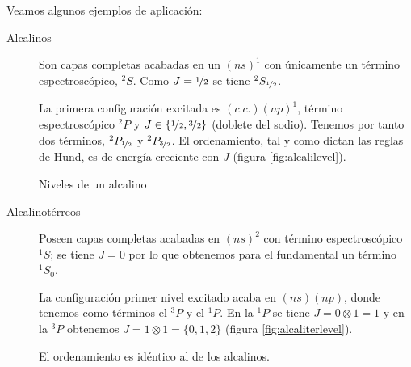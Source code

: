 Veamos algunos ejemplos de aplicación:
\begin{description}
\item[Alcalinos]
  Son capas completas acabadas en un $(ns)^1$ con únicamente un término
  espectroscópico, ${}^2S$. Como $J={\nicefrac{1}{2}}$ se tiene
  ${}^2S_{{\nicefrac{1}{2}}}$. 

  La primera configuración excitada es $(c.c.)(np)^1$, término
  espectroscópico ${}^2P$ y $J\in\{{\nicefrac{1}{2}},\nicefrac{3}{2}\}$ (doblete del
  sodio). Tenemos por tanto dos términos, ${}^2P_{{\nicefrac{1}{2}}}$ y
  ${}^2P_{\nicefrac{3}{2}}$. El ordenamiento, tal y como dictan las
  reglas de Hund, es de energía creciente con $J$ (figura \ref{fig:alcalilevel}).
  \begin{marginfigure}
    \centering
    \caption{Niveles de un alcalino}
    \label{fig:alcalilevel}
  \end{marginfigure}


\item[Alcalinotérreos]
  Poseen capas completas acabadas en $(ns)^2$ con término
  espectroscópico ${}^1S$; se tiene $J=0$ por lo que obtenemos para el
  fundamental un término ${}^1S_0$.

  La configuración primer nivel excitado acaba en $(ns)(np)$, donde
  tenemos como términos el ${}^3P$ y el ${}^1P$. En la ${}^1P$ se
  tiene $J=0\otimes1=1$ y en la ${}^3P$ obtenemos
  $J=1\otimes1=\{0,1,2\}$ (figura \ref{fig:alcaliterlevel}). 

  El ordenamiento es idéntico al de los alcalinos.


\end{description}
